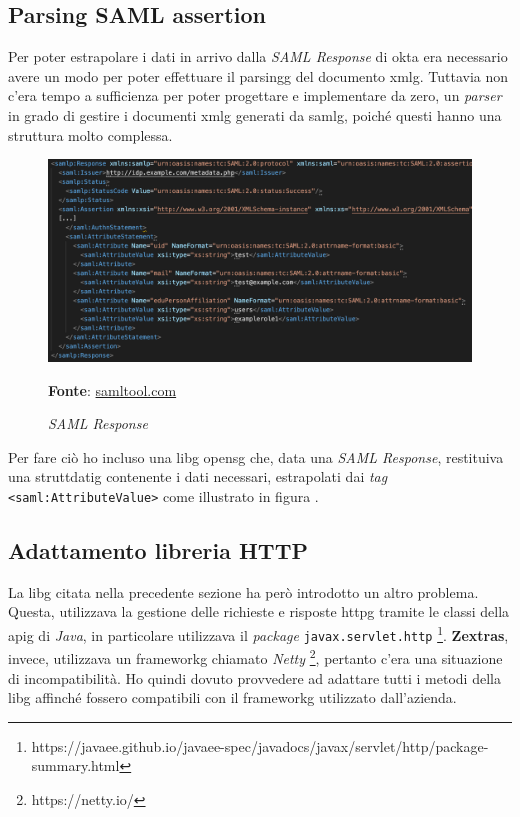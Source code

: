 \subsection{Parsing SAML assertion}
Per poter estrapolare i dati in arrivo dalla \textit{SAML Response} di \gls{okta} era necessario avere un modo per poter effettuare il \gls{parsingg} del documento \gls{xmlg}. Tuttavia non c'era tempo a sufficienza per poter progettare e implementare da zero, un \textit{parser} in grado di gestire i documenti \gls{xmlg} generati da \gls{samlg}, poiché questi hanno una struttura molto complessa.

    \begin{figure}[ht]
        \centering
        \includegraphics[width=1\textwidth]{immagini/saml_response.png}
        \caption{\textit{SAML Response}}
        \textbf{Fonte}:
        \href{https://www.samltool.com/generic_sso_res.php}{samltool.com}
        \label{fig: SAML Response}
    \end{figure}
    
Per fare ciò ho incluso una \gls{libg} \gls{opensg} che, data una \textit{SAML Response}, restituiva una \gls{struttdatig} contenente i dati necessari, estrapolati dai \textit{tag} \texttt{<saml:AttributeValue>} come illustrato in figura .

\newpage

\subsection{Adattamento libreria HTTP}
La \gls{libg} citata nella precedente sezione ha però introdotto un altro problema. Questa, utilizzava la gestione delle richieste e risposte \gls{httpg} tramite le classi della \gls{apig} di \textit{Java}, in particolare utilizzava il \textit{package} \texttt{javax.servlet.http} \footnote{https://javaee.github.io/javaee-spec/javadocs/javax/servlet/http/package-summary.html}. \textbf{Zextras}, invece, utilizzava un \gls{frameworkg} chiamato \textit{Netty} \footnote{https://netty.io/}, pertanto c'era una situazione di incompatibilità. Ho quindi dovuto provvedere ad adattare tutti i metodi della \gls{libg} affinché fossero compatibili con il \gls{frameworkg} utilizzato dall'azienda. \\

